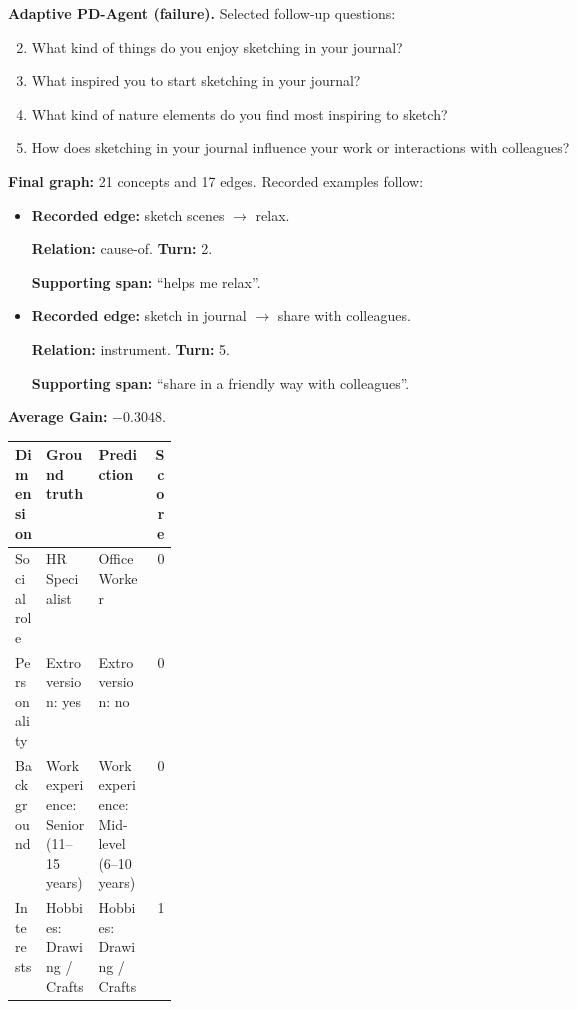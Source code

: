 \documentclass{ieeeaccess}
\begin{document}
\begin{multicols*}{2}
\begin{samepage}
\noindent\textbf{Adaptive PD-Agent (failure).} Selected follow-up questions:\par\nopagebreak[4]
\begin{enumerate}
\setcounter{enumi}{1}
\item What kind of things do you enjoy sketching in your journal?
\item What inspired you to start sketching in your journal?
\item What kind of nature elements do you find most inspiring to sketch?
\item How does sketching in your journal influence your work or interactions with colleagues?
\end{enumerate}
\end{samepage}
\noindent\begin{minipage}{\linewidth}
\noindent\textbf{Final graph:} 21 concepts and 17 edges. Recorded examples follow:
\begin{itemize}
\item \textbf{Recorded edge:} sketch scenes $\rightarrow$ relax.
\par\textbf{Relation:} cause-of. \textbf{Turn:} 2.
\par\textbf{Supporting span:} ``helps me relax''.
\item \textbf{Recorded edge:} sketch in journal $\rightarrow$ share with colleagues.
\par\textbf{Relation:} instrument. \textbf{Turn:} 5.
\par\textbf{Supporting span:} ``share in a friendly way with colleagues''.
\end{itemize}
\end{minipage}\par\smallskip
\noindent\begin{minipage}{\linewidth}
\noindent\textbf{Average Gain:} $-0.3048$.\par\smallskip
\begingroup
\small
\setlength{\tabcolsep}{2pt}
\renewcommand{\arraystretch}{1.12}
\noindent\begin{tabularx}{\linewidth}{@{}p{0.19\linewidth}>{\raggedright\arraybackslash}X>{\raggedright\arraybackslash}Xr@{}}
\toprule
Dimension & Ground truth & Prediction & Score \\
\midrule
Social role & HR Specialist & Office Worker & 0 \\
\addlinespace[2pt]
Personality & Extroversion: yes & Extroversion: no & 0 \\
\addlinespace[2pt]
Background & Work experience: Senior (11--15 years) & Work experience: Mid-level (6--10 years) & 0 \\
\addlinespace[2pt]
Interests & Hobbies: Drawing / Crafts & Hobbies: Drawing / Crafts & 1 \\
\bottomrule
\end{tabularx}\par
\endgroup
\end{minipage}\par\medskip


\end{multicols*}
\end{document}
